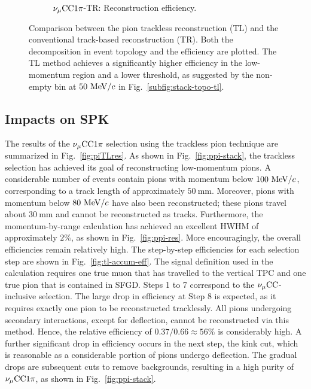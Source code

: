 \begin{figure}[ht]
\begin{subfigure}{\dbfigwid\textwidth}
                    \caption{$\nu_{\mu}\textrm{CC}1\pi$-TR: Reconstruction efficiency.}
                    \label{subfig:ppi-eff-tr}
               \end{subfigure}
              \caption{Comparison between the pion trackless reconstruction (TL) and the conventional track-based reconstruction (TR). Both the decomposition in event topology and the efficiency are plotted. The TL method achieves a significantly higher efficiency in the low-momentum region and a lower threshold, as suggested by the non-empty bin at $50~\textrm{MeV}/c$ in Fig.~\ref{subfig:stack-topo-tl}.}
               \label{fig:tltr-comp}
            \end{figure}


     \subsection{Impacts on SPK}
          The results of the $\nu_{\mu}\textrm{CC}1\pi$ selection using the trackless pion technique are summarized in Fig.~\ref{fig:piTLres}.
          As shown in Fig.~\ref{fig:ppi-stack}, the trackless selection has achieved its goal of reconstructing low-momentum pions.
          A considerable number of events contain pions with momentum below $100~\textrm{MeV}/c$, corresponding to a track length of approximately $50~\textrm{mm}$.
          Moreover, pions with momentum below $80~\textrm{MeV}/c$ have also been reconstructed; these pions travel about $30~\textrm{mm}$ and cannot be reconstructed as tracks.
          Furthermore, the momentum-by-range calculation has achieved an excellent HWHM of approximately $2\%$, as shown in Fig.~\ref{fig:ppi-res}.
          More encouragingly, the overall efficiencies remain relatively high.
          The step-by-step efficiencies for each selection step are shown in Fig.~\ref{fig:tl-accum-eff}.
          The signal definition used in the calculation requires one true muon that has travelled to the vertical TPC and one true pion that is contained in SFGD.
          Steps 1 to 7 correspond to the $\nu_{\mu}\textrm{CC}$-inclusive selection.
          The large drop in efficiency at Step 8 is expected, as it requires exactly one pion to be reconstructed tracklessly.
          All pions undergoing secondary interactions, except for deflection, cannot be reconstructed via this method.
          Hence, the relative efficiency of $0.37/0.66\approx56\%$ is considerably high.
          A further significant drop in efficiency occurs in the next step, the kink cut, which is reasonable as a considerable portion of pions undergo deflection.
          The gradual drops are subsequent cuts to remove backgrounds, resulting in a high purity of $\nu_{\mu}\textrm{CC}1\pi$, as shown in Fig.~\ref{fig:ppi-stack}.

